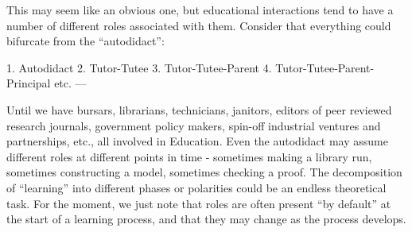 This may seem like an obvious one, but educational interactions tend to
have a number of different roles associated with them. Consider that
everything could bifurcate from the ``autodidact'':

1. Autodidact 2. Tutor-Tutee 3. Tutor-Tutee-Parent
4. Tutor-Tutee-Parent-Principal etc. ---

Until we have bursars, librarians, technicians, janitors, editors of
peer reviewed research journals, government policy makers, spin-off
industrial ventures and partnerships, etc., all involved in
Education. Even the autodidact may assume different roles at different
points in time - sometimes making a library run, sometimes
constructing a model, sometimes checking a proof. The decomposition of
``learning'' into different phases or polarities could be an endless
theoretical task. For the moment, we just note that roles are often
present ``by default'' at the start of a learning process, and that
they may change as the process develops.

